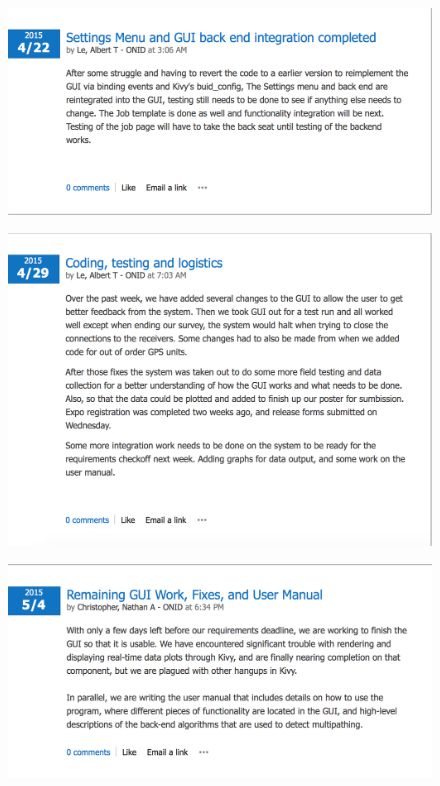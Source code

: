 \documentclass[12pt]{article}
\begin{document}
\begin{figure}[H]
\centering
\includegraphics[scale=0.5]{blog_posts/2015_4_22.png}
\label{fig:my_label}
\end{figure}

\begin{figure}[H]
\centering
\includegraphics[scale=0.5]{blog_posts/2015_4_29.png}
\label{fig:my_label}
\end{figure}

\begin{figure}[H]
\centering
\includegraphics[scale=0.5]{blog_posts/2015_5_4.png}
\label{fig:my_label}
\end{figure}
\end{document}
